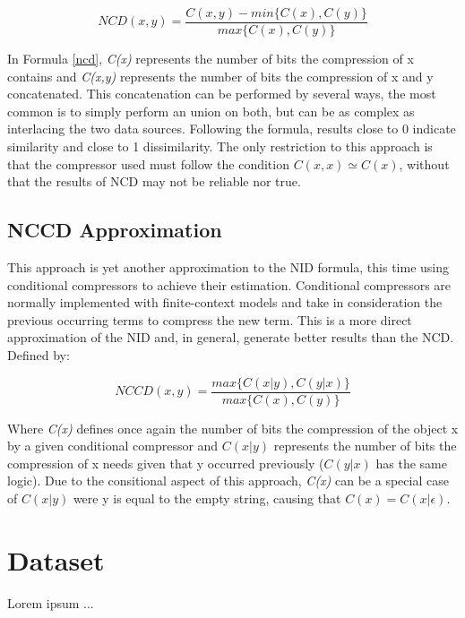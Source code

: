 \documentclass[12pt]{article}
\begin{document}
\begin{equation}\label{ncd}
  NCD(x,y) = \frac{C(x,y)-min\{C(x), C(y)\}}{max\{C(x),C(y)\}}
\end{equation}

In Formula \ref{ncd}, \textit{C(x)} represents the number of bits the compression of x contains and \textit{C(x,y)} represents the number of bits the compression of x and y concatenated. This concatenation can be performed by several ways, the most common is to simply perform an union on both, but can be as complex as interlacing the two data sources. Following the formula, results close to 0 indicate similarity and close to 1 dissimilarity. The only restriction to this approach is that the compressor used must follow the condition $C(x,x) \simeq C(x)$, without that the results of NCD may not be reliable nor true. 

\subsection{NCCD Approximation}
This approach is yet another approximation to the NID formula, this time using conditional compressors to achieve their estimation. Conditional compressors are normally implemented with finite-context models and take in consideration the previous occurring terms to compress the new term. This is a more direct approximation of the NID and, in general, generate better results than the NCD. Defined by:

\begin{equation}
  NCCD(x,y) = \frac{max\{C(x|y), C(y|x)\}}{max\{C(x), C(y)\}}
\end{equation}

Where \textit{C(x)} defines once again the number of bits the compression of the object x by a given conditional compressor and $C(x|y)$ represents the number of bits the compression of x needs given that y occurred previously ($C(y|x)$ has the same logic). Due to the consitional aspect of this approach, \textit{C(x)} can be a special case of $C(x|y)$ were y is equal to the empty string, causing that $C(x) = C(x|\epsilon)$.

\newpage
\section{Dataset}
Lorem ipsum ...

\end{document}

